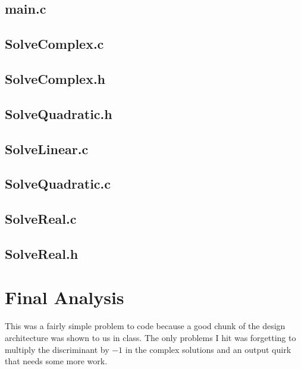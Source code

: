 \documentclass[letterpaper,oneside]{scrartcl}
\begin{document}
\subsection{main.c}
\newpage

\subsection{SolveComplex.c}

\subsection{SolveComplex.h}

\subsection{SolveQuadratic.h}

\subsection{SolveLinear.c}

\subsection{SolveQuadratic.c}

\subsection{SolveReal.c}

\subsection{SolveReal.h}

\section{Final Analysis}
This was a fairly simple problem to code because a good chunk of the design architecture was shown to us in class.
The only problems I hit was forgetting to multiply the discriminant by $-1$ in the complex solutions and an
output quirk that needs some more work.
\end{document}
